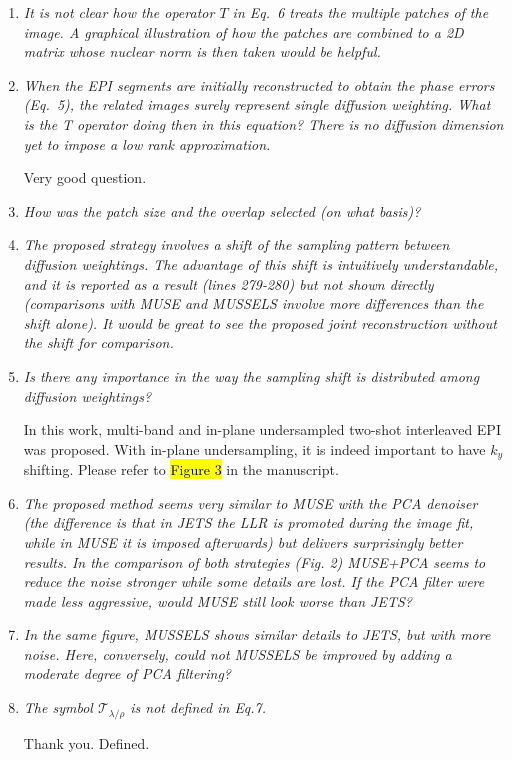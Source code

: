 \documentclass[a4paper,11pt,twoside]{report}
\begin{document}
\begin{enumerate}
    \item \textit{It is not clear how the operator $T$ in Eq.~6 treats the multiple patches of the image. A graphical illustration of how the patches are combined to a 2D matrix whose nuclear norm is then taken would be helpful.}
    \item \textit{When the EPI segments are initially reconstructed to obtain the phase errors (Eq.~5), the related images surely represent single diffusion weighting. What is the T operator doing then in this equation? There is no diffusion dimension yet to impose a low rank approximation.}

    \hspace{1em} Very good question.

    \item \textit{How was the patch size and the overlap selected (on what basis)?}
    \item \textit{The proposed strategy involves a shift of the sampling pattern between diffusion weightings. The advantage of this shift is intuitively understandable, and it is reported as a result (lines 279-280) but not shown directly (comparisons with MUSE and MUSSELS involve more differences than the shift alone). It would be great to see the proposed joint reconstruction without the shift for comparison.}
    \item \textit{Is there any importance in the way the sampling shift is distributed among diffusion weightings?}

    \hspace{1em} In this work, multi-band and in-plane undersampled
    two-shot interleaved EPI was proposed.
    With in-plane undersampling,
    it is indeed important to have $k_y$ shifting.
    Please refer to \hl{Figure 3} in the manuscript.

    \item \textit{The proposed method seems very similar to MUSE with the PCA denoiser (the difference is that in JETS the LLR is promoted during the image fit, while in MUSE it is imposed afterwards) but delivers surprisingly better results. In the comparison of both strategies (Fig. 2) MUSE+PCA seems to reduce the noise stronger while some details are lost. If the PCA filter were made less aggressive, would MUSE still look worse than JETS?}
    \item \textit{In the same figure, MUSSELS shows similar details to JETS, but with more noise. Here, conversely, could not MUSSELS be improved by adding a moderate degree of PCA filtering?}
    \item \textit{The symbol $\mathcal{T}_{\lambda / \rho}$ is not defined in Eq.7.}

    \hspace{1em} Thank you. Defined.

\end{enumerate}
\end{document}
